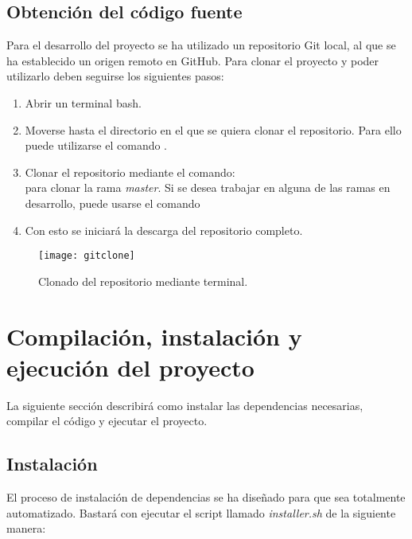 \subsection{Obtención del código fuente}

Para el desarrollo del proyecto se ha utilizado un repositorio Git local, al que se ha establecido un origen remoto en GitHub. Para clonar el proyecto y poder utilizarlo deben seguirse los siguientes pasos:

\begin{enumerate}
\item Abrir un terminal bash. 
\item Moverse hasta el directorio en el que se quiera clonar el repositorio. Para ello puede utilizarse el comando .
\item Clonar el repositorio mediante el comando:\\  para clonar la rama \emph{master}. Si se desea trabajar en alguna de las ramas en desarrollo, puede usarse el comando\\ 
\item Con esto se iniciará la descarga del repositorio completo.
\end{enumerate}

\begin{figure}
	\centering
	\texttt{[image: gitclone]}
	\caption[Clonado de repositorio Git]{Clonado del repositorio mediante terminal.}\label{fig:gitclone}
\end{figure}

\section{Compilación, instalación y ejecución del proyecto}
La siguiente sección describirá como instalar las dependencias necesarias, compilar el código y ejecutar el proyecto.

\subsection{Instalación}
\label{subsec:installersh}

El proceso de instalación de dependencias se ha diseñado para que sea totalmente automatizado. 
Bastará con ejecutar el script llamado \emph{installer.sh} de la siguiente manera: 


